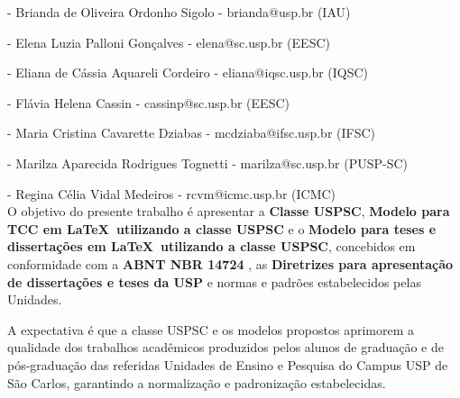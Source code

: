    - Brianda de Oliveira Ordonho Sigolo - brianda@usp.br (IAU)	
	
   - Elena Luzia Palloni Gonçalves - elena@sc.usp.br (EESC)	
	
   - Eliana de Cássia Aquareli Cordeiro - eliana@iqsc.usp.br (IQSC)	
	
   - Flávia Helena Cassin - cassinp@sc.usp.br (EESC)
	
   - Maria Cristina Cavarette Dziabas - mcdziaba@ifsc.usp.br (IFSC)
	
	 - Marilza Aparecida Rodrigues Tognetti - marilza@sc.usp.br (PUSP-SC)
	
	 - Regina Célia Vidal Medeiros - rcvm@icmc.usp.br (ICMC) \\
	
	O objetivo do presente trabalho é apresentar a \textbf{Classe USPSC}, \textbf{Modelo para TCC em \LaTeX\ utilizando a classe USPSC} e o \textbf{Modelo para teses e dissertações em \LaTeX\ utilizando a classe USPSC}, concebidos em conformidade com a \textbf{ABNT NBR 14724} \cite{nbr14724}, as \textbf{Diretrizes para apresentação de dissertações e teses da USP} \cite{sibi2016} e normas e padrões estabelecidos pelas Unidades. 
	
	A expectativa é que a classe USPSC e os modelos propostos aprimorem a qualidade dos trabalhos acadêmicos produzidos pelos alunos de graduação e de pós-graduação das referidas Unidades de Ensino e Pesquisa do Campus USP de São Carlos, garantindo a normalização e padronização estabelecidas.
	
	
